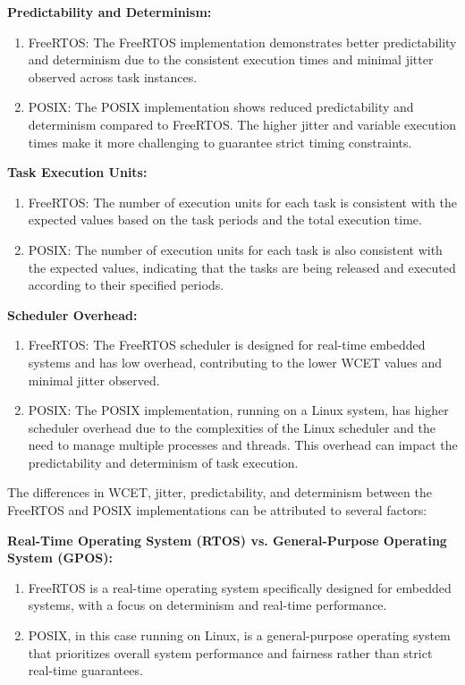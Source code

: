 \documentclass[a4paper,11pt]{article}%
\newenvironment{qanda}{\setlength{\parindent}{0pt}}{\bigskip}
\begin{document}
\begin{qanda}
\begin{enumerate}
			\textbf{Predictability and Determinism:}
			\begin{enumerate}
				\item FreeRTOS: The FreeRTOS implementation demonstrates better predictability and determinism due to the consistent execution times and minimal jitter observed across task instances.
				\item POSIX: The POSIX implementation shows reduced predictability and determinism compared to FreeRTOS. The higher jitter and variable execution times make it more challenging to guarantee strict timing constraints.
			\end{enumerate}

			\textbf{Task Execution Units:}
			\begin{enumerate}
				\item FreeRTOS: The number of execution units for each task is consistent with the expected values based on the task periods and the total execution time.
				\item POSIX: The number of execution units for each task is also consistent with the expected values, indicating that the tasks are being released and executed according to their specified periods.
			\end{enumerate}

			\textbf{Scheduler Overhead:}
			\begin{enumerate}
				\item FreeRTOS: The FreeRTOS scheduler is designed for real-time embedded systems and has low overhead, contributing to the lower WCET values and minimal jitter observed.
				\item POSIX: The POSIX implementation, running on a Linux system, has higher scheduler overhead due to the complexities of the Linux scheduler and the need to manage multiple processes and threads. This overhead can impact the predictability and determinism of task execution.
			\end{enumerate}

			The differences in WCET, jitter, predictability, and determinism between the FreeRTOS and POSIX implementations can be attributed to several factors:

			\textbf{Real-Time Operating System (RTOS) vs. General-Purpose Operating System (GPOS):}
			\begin{enumerate}
				\item FreeRTOS is a real-time operating system specifically designed for embedded systems, with a focus on determinism and real-time performance.
				\item POSIX, in this case running on Linux, is a general-purpose operating system that prioritizes overall system performance and fairness rather than strict real-time guarantees.
			\end{enumerate}


\end{enumerate}
\end{qanda}
\end{document}
